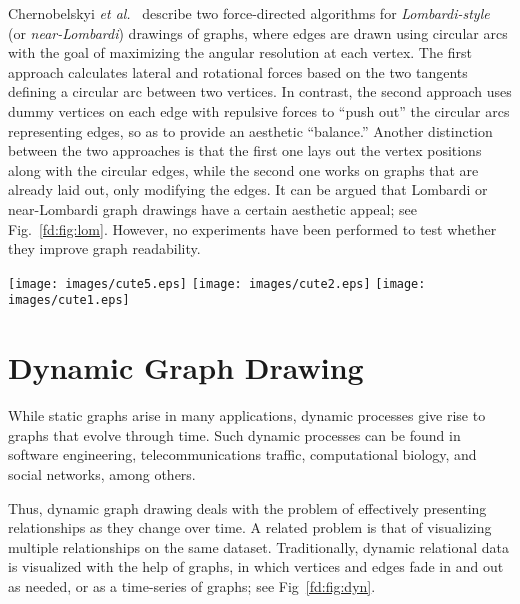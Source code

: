 \documentclass[notitlepage,letter,11pt]{article}
\begin{document}
Chernobelskyi {\em et al.}~\cite{ccgkt-fdl-11} describe two force-directed algorithms for 
\emph{Lombardi-style} (or \emph{near-Lombardi})
drawings of graphs, where edges are drawn using circular arcs with
the goal of maximizing the angular resolution at each vertex.
The first approach calculates
lateral and rotational forces based on the two tangents
defining a circular arc between two vertices.
In contrast, the second approach uses
dummy vertices on each edge with repulsive forces
to ``push out'' the circular arcs representing
edges, so as to provide an aesthetic ``balance.''
Another distinction between the two approaches is that
the first one lays out the vertex positions along with
the circular edges, while the second one works on graphs
that are already laid out, only modifying the edges. It can be argued
that Lombardi or near-Lombardi graph drawings have a certain aesthetic
appeal; see Fig.~\ref{fd:fig:lom}. However, no experiments have been performed to test whether they
improve graph readability.


\begin{figure*}[t]
\begin{center}
\texttt{[image: images/cute5.eps]}
\texttt{[image: images/cute2.eps]}
\texttt{[image: images/cute1.eps]}
\caption{\small\sf Examples of force-directed Lombardi drawings: note
  that every edge is a circular arc and every vertex has perfect
  angular resolution~\cite{ccgkt-fdl-11}.
\label{fd:fig:lom}
}
\end{center}
\end{figure*}


\section{Dynamic Graph Drawing}
\label{fd:sec:dyn}



While static graphs arise in many applications, dynamic processes give
rise to graphs that evolve through time. Such dynamic processes can be
found in software engineering, telecommunications traffic,
computational biology, and social networks, among others. 

Thus, dynamic graph drawing deals with the problem of effectively
presenting relationships as they change over time. A related problem is that of
visualizing multiple relationships on the same dataset. Traditionally,
dynamic relational data is visualized with the help of graphs, in
which vertices and edges fade in and out as needed, or as a time-series of
graphs; see Fig~\ref{fd:fig:dyn}.
\end{document}
